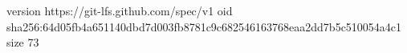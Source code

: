 version https://git-lfs.github.com/spec/v1
oid sha256:64d05fb4a651140dbd7d003fb8781c9c682546163768eaa2dd7b5c510054a4c1
size 73
